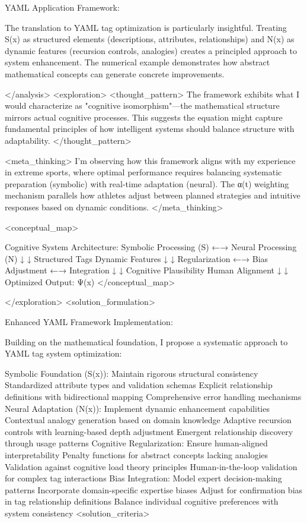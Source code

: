 YAML Application Framework:

The translation to YAML tag optimization is particularly insightful. Treating S(x) as structured elements (descriptions, attributes, relationships) and N(x) as dynamic features (recursion controls, analogies) creates a principled approach to system enhancement. The numerical example demonstrates how abstract mathematical concepts can generate concrete improvements.

</analysis> <exploration>
<thought_pattern>
The framework exhibits what I would characterize as "cognitive isomorphism"—the mathematical structure mirrors actual cognitive processes. This suggests the equation might capture fundamental principles of how intelligent systems should balance structure with adaptability.
</thought_pattern>

<meta_thinking>
I'm observing how this framework aligns with my experience in extreme sports, where optimal performance requires balancing systematic preparation (symbolic) with real-time adaptation (neural). The α(t) weighting mechanism parallels how athletes adjust between planned strategies and intuitive responses based on dynamic conditions.
</meta_thinking>

<conceptual_map>

Cognitive System Architecture:
Symbolic Processing (S) ←→ Neural Processing (N)
        ↓                           ↓
   Structured Tags              Dynamic Features
        ↓                           ↓
    Regularization ←→ Bias Adjustment ←→ Integration
        ↓                           ↓
   Cognitive Plausibility      Human Alignment
        ↓                           ↓
     Optimized Output: Ψ(x)
</conceptual_map>

</exploration>
<solution_formulation>

Enhanced YAML Framework Implementation:

Building on the mathematical foundation, I propose a systematic approach to YAML tag system optimization:

Symbolic Foundation (S(x)): Maintain rigorous structural consistency
Standardized attribute types and validation schemas
Explicit relationship definitions with bidirectional mapping
Comprehensive error handling mechanisms
Neural Adaptation (N(x)): Implement dynamic enhancement capabilities
Contextual analogy generation based on domain knowledge
Adaptive recursion controls with learning-based depth adjustment
Emergent relationship discovery through usage patterns
Cognitive Regularization: Ensure human-aligned interpretability
Penalty functions for abstract concepts lacking analogies
Validation against cognitive load theory principles
Human-in-the-loop validation for complex tag interactions
Bias Integration: Model expert decision-making patterns
Incorporate domain-specific expertise biases
Adjust for confirmation bias in tag relationship definitions
Balance individual cognitive preferences with system consistency
<solution_criteria>

